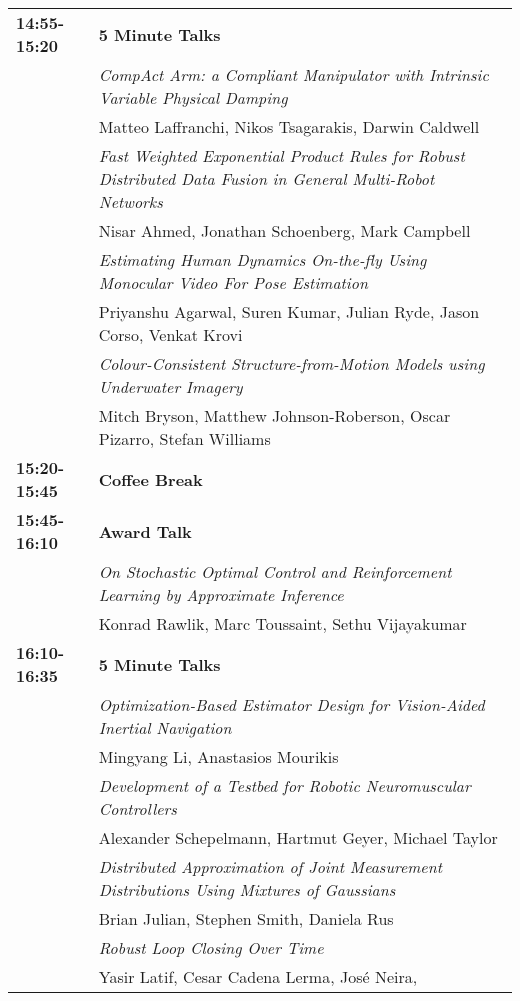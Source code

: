 \newpage
\begin{tabular}{lp{13.8cm}}
{\bf 14:55-15:20} & {\bf 5 Minute Talks} \\[2mm]
& \em{ CompAct Arm: a Compliant Manipulator with Intrinsic Variable Physical Damping}\\
& Matteo Laffranchi\label{Laffranchi}, Nikos Tsagarakis, Darwin Caldwell\\[2mm]
& \em{ Fast Weighted Exponential Product Rules for Robust Distributed Data Fusion in General Multi-Robot Networks}\\
& Nisar Ahmed\label{Ahmed}, Jonathan Schoenberg, Mark Campbell\\[2mm]
& \em{ Estimating Human Dynamics On-the-fly Using Monocular Video For Pose Estimation}\\
& Priyanshu Agarwal\label{Agarwal}, Suren Kumar, Julian Ryde, Jason Corso, Venkat Krovi\\[2mm]
& \em{ Colour-Consistent Structure-from-Motion Models using Underwater Imagery}\\
& Mitch Bryson\label{Bryson}, Matthew Johnson-Roberson, Oscar Pizarro, Stefan Williams\\[2mm]

{\bf 15:20-15:45} & {\bf Coffee Break} \\[4mm]

{\bf 15:45-16:10} & {\bf Award Talk} \\[2mm]
& \em{ On Stochastic Optimal Control and Reinforcement Learning by Approximate Inference}\\
& Konrad Rawlik\label{Rawlik}, Marc Toussaint, Sethu Vijayakumar\\[2mm]

{\bf 16:10-16:35} & {\bf 5 Minute Talks} \\[2mm]
& \em{ Optimization-Based Estimator Design for Vision-Aided Inertial Navigation}\\
& Mingyang Li\label{Li}, Anastasios Mourikis\\[2mm]
& \em{ Development of a Testbed for Robotic Neuromuscular Controllers}\\
& Alexander Schepelmann\label{Schepelmann}, Hartmut Geyer, Michael Taylor\\[2mm]
& \em{ Distributed Approximation of Joint Measurement Distributions Using Mixtures of Gaussians}\\
& Brian Julian\label{Julian}, Stephen Smith, Daniela Rus\\[2mm]
& \em{ Robust Loop Closing Over Time}\\
& Yasir Latif\label{Latif}, Cesar Cadena Lerma, José Neira, \\[2mm]





\end{tabular}
